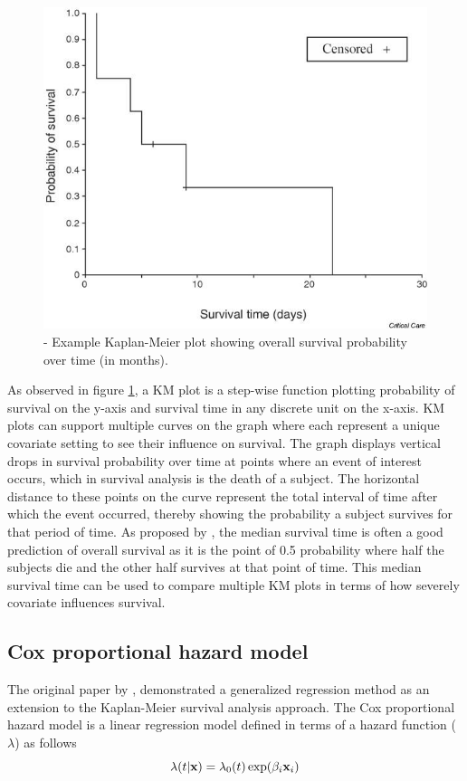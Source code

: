 \documentclass{l4proj}
\begin{document}
\begin{figure}[h]
    \centering
    \includegraphics[scale=0.3]{images/KM-plot-example.jpg}
    \caption{\cite{bewick2004statistics} - Example Kaplan-Meier plot showing overall survival probability over time (in months). }
    \label{fig:km-plot-example}
\end{figure}

As observed in figure \ref{fig:km-plot-example}, a KM plot is a step-wise function plotting probability of survival on the y-axis and survival time in any discrete unit on the x-axis. KM plots can support multiple curves on the graph where each represent a unique covariate setting to see their influence on survival. The graph displays vertical drops in survival probability over time at points where an event of interest occurs, which in survival analysis is the death of a subject. The horizontal distance to these points on the curve represent the total interval of time after which the event occurred, thereby showing the probability a subject survives for that period of time. As proposed by \cite{bewick2004statistics}, the median survival time is often a good prediction of overall survival as it is the point of 0.5 probability where half the subjects die and the other half survives at that point of time. This median survival time can be used to compare multiple KM plots in terms of how severely  covariate influences survival. 


\subsection{Cox proportional hazard model} \label{cph-background}
The original paper by \cite{cox1972regression}, demonstrated a generalized regression method as an extension to the Kaplan-Meier survival analysis approach. The Cox proportional hazard model is a linear regression model defined in terms of a hazard function (\(\lambda\)) as follows
\begin{equation}
    \centering
    \lambda (t | \textbf{x}) = \lambda_0 (t) \exp (\beta_i \textbf{x}_i)
    \label{eq:hazard model}
\end{equation}
\end{document}

